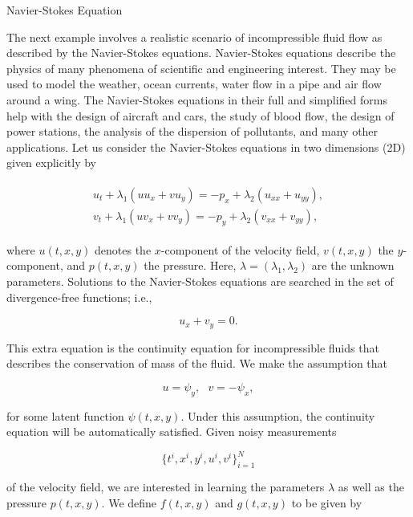 \documentclass[book.tex]{subfiles}
\begin{document}
\begin{example}{Navier-Stokes Equation}

The next example involves a realistic scenario of incompressible fluid flow as described by the Navier-Stokes equations. Navier-Stokes equations describe the physics of many phenomena of scientific and engineering interest. They may be used to model the weather, ocean currents, water flow in a pipe and air flow around a wing. The Navier-Stokes equations in their full and simplified forms help with the design of aircraft and cars, the study of blood flow, the design of power stations, the analysis of the dispersion of pollutants, and many other applications. Let us consider the Navier-Stokes equations in two dimensions (2D) given explicitly by


\begin{align}
\begin{split}
u_t + \lambda_1 (u u_x + v u_y) = -p_x + \lambda_2(u_{xx} + u_{yy}),\\
v_t + \lambda_1 (u v_x + v v_y) = -p_y + \lambda_2(v_{xx} + v_{yy}),    
\end{split}
\end{align}


where $u(t, x, y)$ denotes the $x$-component of the velocity field, $v(t, x, y)$ the $y$-component, and $p(t, x, y)$ the pressure. Here, $\lambda = (\lambda_1, \lambda_2)$ are the unknown parameters. Solutions to the Navier-Stokes equations are searched in the set of divergence-free functions; i.e.,

\begin{equation}
u_x + v_y = 0.    
\end{equation}


This extra equation is the continuity equation for incompressible fluids that describes the conservation of mass of the fluid. We make the assumption that

\begin{equation}
u = \psi_y,\ \ \ v = -\psi_x,    
\end{equation}


for some latent function $\psi(t,x,y)$. Under this assumption, the continuity equation will be automatically satisfied. Given noisy measurements

\begin{equation}
\{t^i, x^i, y^i, u^i, v^i\}_{i=1}^{N}    
\end{equation}


of the velocity field, we are interested in learning the parameters $\lambda$ as well as the pressure $p(t,x,y)$. We define $f(t,x,y)$ and $g(t,x,y)$ to be given by


\end{example}
\end{document}
